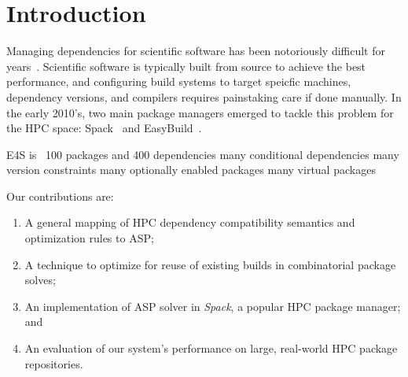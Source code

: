 \section{Introduction}
\label{sec:intro}

Managing dependencies for scientific software has been notoriously difficult for
years~\cite{hoste+:pyhpc12,gamblin+:sc15,dubois2003johnny,hochstein+:2011-build}.
Scientific software is typically built from source to achieve the best performance, and
configuring build systems to target speicfic machines, dependency versions, and
compilers requires painstaking care if done manually. In the early 2010's, two main
package managers emerged to tackle this problem for the HPC space:
Spack~\cite{gamblin+:sc15} and EasyBuild~\cite{hoste+:pyhpc12}.


\cite{}

E4S is ~100 packages and 400 dependencies
many conditional dependencies
many version constraints
many optionally enabled packages
many virtual packages






Our contributions are:

\begin{enumerate}
\item A general mapping of HPC dependency compatibility semantics and optimization rules to ASP;
\item A technique to optimize for reuse of existing builds in combinatorial package solves;
\item An implementation of ASP solver in {\it Spack}, a popular HPC package manager; and
\item An evaluation of our system's performance on large, real-world HPC package repositories.
\end{enumerate}
